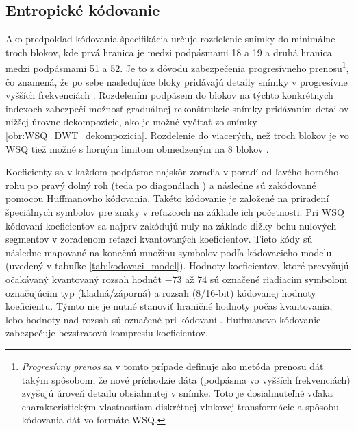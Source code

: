   \subsection{Entropické kódovanie}
  Ako predpoklad kódovania špecifikácia určuje rozdelenie snímky do minimálne troch blokov, kde prvá hranica je medzi podpásmami 18 a 19 a druhá
  hranica medzi podpásmami 51 a 52. Je to z dôvodu zabezpečenia progresívneho prenosu\footnote{\emph{Progresívny prenos} sa v tomto prípade definuje ako
  metóda prenosu dát takým spôsobom, že nové príchodzie dáta (podpásma vo vyšších frekvenciách) zvyšujú úroveň detailu obsiahnutej v snímke.
  Toto je dosiahnuteľné vďaka charakteristickým vlastnostiam diskrétnej vlnkovej transformácie a spôsobu kódovania dát vo formáte WSQ.}, čo znamená,
  že po sebe nasledujúce bloky pridávajú detaily snímky v progresívne vyšších frekvenciách \cite{WSQSpecification}. Rozdelením podpásem do blokov na týchto
  konkrétnych indexoch zabezpečí možnosť graduálnej rekonštrukcie snímky pridávaním detailov nižšej úrovne dekompozície,
  ako je možné vyčítať zo snímky \ref{obr:WSQ_DWT_dekompozicia}. Rozdelenie do viacerých, než troch blokov je vo WSQ tiež možné s horným limitom obmedzeným
  na 8 blokov \cite{brislawn1996compression}.

  Koeficienty sa v každom podpásme najskôr zoradia v poradí od ľavého horného rohu po pravý dolný roh (teda po diagonálach )
  a následne sú zakódované pomocou Huffmanovho kódovania. Takéto kódovanie je založené na priradení špeciálnych symbolov pre znaky v reťazcoch na základe
  ich početnosti. Pri WSQ kódovaní koeficientov sa najprv zakódujú nuly na základe dĺžky behu nulových segmentov v zoradenom reťazci kvantovaných koeficientov.
  Tieto kódy sú následne mapované na konečnú množinu symbolov podľa kódovacieho modelu (uvedený v tabuľke \ref{tab:kodovaci_model}). Hodnoty koeficientov,
  ktoré prevyšujú očakávaný kvantovaný rozsah hodnôt $-73$ až $74$ sú označené riadiacim symbolom označujúcim typ (kladná/záporná) a rozsah (8/16-bit)
  kódovanej hodnoty koeficientu. Týmto nie je nutné stanoviť hraničné hodnoty počas kvantovania, lebo hodnoty nad rozsah sú označené pri
  kódovaní \cite{brislawn1996compression}. Huffmanovo kódovanie zabezpečuje bezstratovú kompresiu koeficientov.

